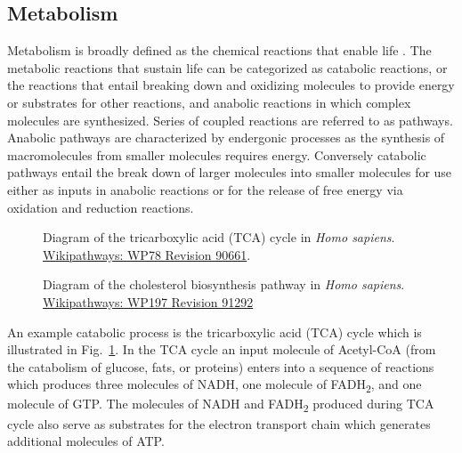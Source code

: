 \label{prelimMetab}
\begin{DoubleSpace*}
\section{Metabolism}
Metabolism is broadly defined as the chemical reactions that enable life \cite{voet2013}. The metabolic reactions that sustain life can be categorized as catabolic reactions, or the reactions that entail breaking down and oxidizing molecules to provide energy or substrates for other reactions, and anabolic reactions in which complex molecules are synthesized. Series of coupled reactions are referred to as pathways. Anabolic pathways are characterized by endergonic processes as the synthesis of macromolecules from smaller molecules requires energy. Conversely catabolic pathways entail the break down of larger molecules into smaller molecules for use either as inputs in anabolic reactions or for the release of free energy via oxidation and reduction reactions. 
\begin{figure}[ht!]
	\caption[Diagram of the tricarboxylic acid (TCA) cycle in \emph{Homo sapiens}]{\DoubleSpacing Diagram of the tricarboxylic acid (TCA) cycle in \emph{Homo sapiens}. \href{https://www.wikipathways.org/index.php/Pathway:WP78}{Wikipathways: WP78 Revision 90661}.\label{fig:tca} }
\end{figure}

\begin{figure}[ht!]
	\caption[Diagram of the cholesterol biosynthesis pathway in \emph{Homo sapiens}]{\DoubleSpacing Diagram of the cholesterol biosynthesis pathway in \emph{Homo sapiens}. \href{https://www.wikipathways.org/index.php/Pathway:WP197}{Wikipathways: WP197 Revision 91292} \label{fig:chol} }
\end{figure}

An example catabolic process is the tricarboxylic acid (TCA) cycle which is illustrated in Fig.~\ref{fig:tca}. In the TCA cycle an input molecule of Acetyl-CoA (from the catabolism of glucose, fats, or proteins) enters into a sequence of reactions which produces three molecules of NADH, one molecule of FADH\textsubscript{2}, and one molecule of GTP. The molecules of NADH and FADH\textsubscript{2} produced during TCA cycle also serve as substrates for the electron transport chain which generates additional molecules of ATP. 


\end{DoubleSpace*}
